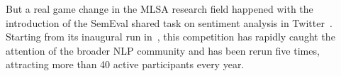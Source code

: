 

But a real game change in the MLSA research field happened with the
introduction of the SemEval shared task on sentiment analysis in
Twitter~\cite{Nakov:13}.  Starting from its inaugural run
in~\citeyear{Nakov:13}, this competition has rapidly caught the
attention of the broader NLP community and has been rerun five times,
attracting more than 40 active participants every year.

